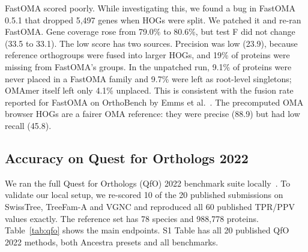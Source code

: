 \documentclass[10pt,letterpaper]{article}
\begin{document}
FastOMA scored poorly. While investigating this, we found a bug in FastOMA 0.5.1 that dropped 5,497 genes when HOGs were split. We patched it and re-ran FastOMA. Gene coverage rose from 79.0\% to 80.6\%, but test F did not change (33.5 to 33.1). The low score has two sources. Precision was low (23.9), because reference orthogroups were fused into larger HOGs, and 19\% of proteins were missing from FastOMA's groups. In the unpatched run, 9.1\% of proteins were never placed in a FastOMA family and 9.7\% were left as root-level singletons; OMAmer itself left only 4.1\% unplaced. This is consistent with the fusion rate reported for FastOMA on OrthoBench by Emms et al.~\cite{emms2026orthofinder3}. The precomputed OMA browser HOGs are a fairer OMA reference: they were precise (88.9) but had low recall (45.8).

\subsection*{Accuracy on Quest for Orthologs 2022}
We ran the full Quest for Orthologs (QfO) 2022 benchmark suite locally~\cite{altenhoff2024qfo}. To validate our local setup, we re-scored 10 of the 20 published submissions on SwissTree, TreeFam-A and VGNC and reproduced all 60 published TPR/PPV values exactly. The reference set has 78 species and 988,778 proteins. Table~\ref{tab:qfo} shows the main endpoints. S1 Table has all 20 published QfO 2022 methods, both Ancestra presets and all benchmarks.
\end{document}
